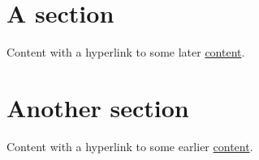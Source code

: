 \documentclass{article}
\begin{document}
\section{A section}
Content with a hyperlink to some later \hyperlink{linkB}{\hypertarget{linkA}{content}}.

\clearpage
\section{Another section}
Content with a hyperlink to some earlier \hypertarget{linkB}{\hyperlink{linkA}{content}}.  
\end{document}
